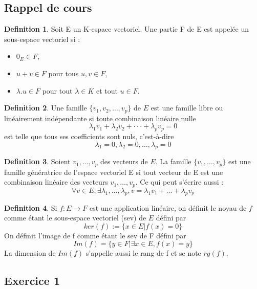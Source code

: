 \documentclass[]{book}
\theoremstyle{definition}
\newtheorem{defn}{Definition}
\begin{document}
\subsection*{Rappel de cours}

\begin{defn}
Soit E un K-espace vectoriel. Une partie F de E est appelée un sous-espace vectoriel si :
\begin{itemize}
\item $0_E \in F$,
\item $u + v \in F$ pour tous $u, v \in F$,
\item $\lambda.u \in F$ pour tout $\lambda \in K$ et tout $u \in F$.
\end{itemize}
\end{defn}


\begin{defn}
Une famille $\{v_1, v_2, \ldots , v_p\}$ de $E$ est une famille libre ou lin\'eairement ind\'ependante si toute combinaison lin\'eaire nulle
$$\lambda_1v_1 + \lambda_2v_2 + ··· + \lambda_p v_p = 0$$
est telle que tous ses coefficients sont nuls, c’est-\`a-dire
$$\lambda_1 = 0, \lambda_2 = 0, \ldots, \lambda_p = 0$$
\end{defn}



\begin{defn}
Soient $v_1, \ldots, v_p$ des vecteurs de $E$. La famille $\{v_1, \ldots, v_p\}$ est une famille g\'en\'eratrice de l'espace vectoriel E si tout vecteur de E est une combinaison lin\'eaire des vecteurs $v_1, \ldots, v_p$. Ce qui peut s'\'ecrire aussi :
$$\forall v \in E, \exists \lambda_1, \ldots, \lambda_p, v = \lambda_1 v_1 + \ldots + \lambda_p v_p$$
\end{defn}


\begin{defn}
Si $f : E \to F$ est une application lin\'eaire, on d\'efinit le noyau de $f$ comme \'etant le sous-espace vectoriel (sev) de $E$ d\'efini par
$$ker(f) := \{x \in E | f(x) = 0\}$$
On d\'efinit l'image de f comme \'etant le sev de F d\'efini par
$$Im(f) = \{y \in F| \exists x \in E, f(x) = y\}$$
La dimension de $Im(f)$ s'appelle aussi le rang de f et se note $rg(f)$.
\end{defn}




\newpage
\subsection*{Exercice 1}
\end{document}
